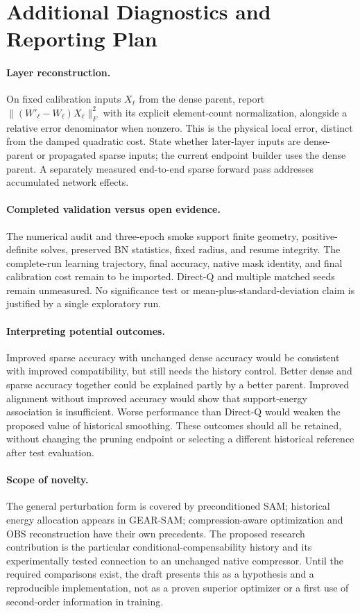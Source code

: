 \section{Additional Diagnostics and Reporting Plan}
\paragraph{Layer reconstruction.}
On fixed calibration inputs $X_\ell$ from the dense parent, report $\| (W'_\ell-W_\ell)X_\ell\|_F^2$ with its explicit element-count normalization, alongside a relative error denominator when nonzero. This is the physical local error, distinct from the damped quadratic cost. State whether later-layer inputs are dense-parent or propagated sparse inputs; the current endpoint builder uses the dense parent. A separately measured end-to-end sparse forward pass addresses accumulated network effects.

\paragraph{Completed validation versus open evidence.}
The numerical audit and three-epoch smoke support finite geometry, positive-definite solves, preserved BN statistics, fixed radius, and resume integrity. The complete-run learning trajectory, final accuracy, native mask identity, and final calibration cost remain to be imported. Direct-Q and multiple matched seeds remain unmeasured. No significance test or mean-plus-standard-deviation claim is justified by a single exploratory run.

\paragraph{Interpreting potential outcomes.}
Improved sparse accuracy with unchanged dense accuracy would be consistent with improved compatibility, but still needs the history control. Better dense and sparse accuracy together could be explained partly by a better parent. Improved alignment without improved accuracy would show that support-energy association is insufficient. Worse performance than Direct-Q would weaken the proposed value of historical smoothing. These outcomes should all be retained, without changing the pruning endpoint or selecting a different historical reference after test evaluation.

\paragraph{Scope of novelty.}
The general perturbation form is covered by preconditioned SAM; historical energy allocation appears in GEAR-SAM; compression-aware optimization and OBS reconstruction have their own precedents. The proposed research contribution is the particular conditional-compensability history and its experimentally tested connection to an unchanged native compressor. Until the required comparisons exist, the draft presents this as a hypothesis and a reproducible implementation, not as a proven superior optimizer or a first use of second-order information in training.
